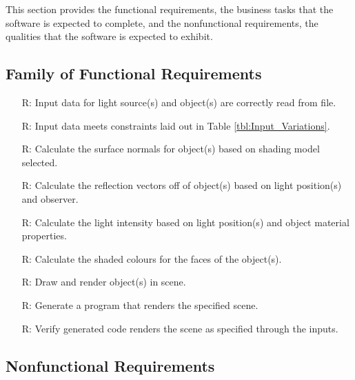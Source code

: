 \documentclass[12pt]{article}
\newcounter{reqnum} %
\begin{document}
This section provides the functional requirements, the business tasks that the
software is expected to complete, and the nonfunctional requirements, the
qualities that the software is expected to exhibit.

\subsection{Family of Functional Requirements}

\noindent \begin{itemize}

\item[R\refstepcounter{reqnum}\thereqnum \label{R_Inputs1}:]Input data for 
light source(s) and object(s) are correctly read from file.
\item[R\refstepcounter{reqnum}\thereqnum \label{R_Inputs2}:]Input data meets 
constraints laid out in Table \ref{tbl:Input_Variations}.
\item[R\refstepcounter{reqnum}\thereqnum \label{R_Calculate1}:] Calculate the 
surface normals for object(s) based on shading model selected.
\item[R\refstepcounter{reqnum}\thereqnum \label{R_Calculate2}:] Calculate the 
reflection vectors off of object(s) based on light position(s) and observer.
\item[R\refstepcounter{reqnum}\thereqnum \label{R_Calculate3}:] Calculate the 
light intensity based on light position(s) and object material properties.
\item[R\refstepcounter{reqnum}\thereqnum \label{R_Calculate4}:] Calculate the 
shaded colours for the faces of the object(s).
\item[R\refstepcounter{reqnum}\thereqnum \label{R_Calculate5}:] Draw and render 
object(s) in scene.
\item[R\refstepcounter{reqnum}\thereqnum \label{R_Output}:] Generate a program 
that renders the specified scene.
\item[R\refstepcounter{reqnum}\thereqnum \label{R_VerifyOutput}:] Verify 
generated code renders the scene as specified through the inputs.

\end{itemize}

\subsection{Nonfunctional Requirements}
\end{document}
